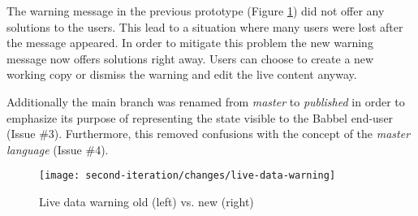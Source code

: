 The warning message in the previous prototype (Figure \ref{fig:live-data-warning}) did not offer any solutions to the users. This lead to a situation where many users were lost after the message appeared. In order to mitigate this problem the new warning message now offers solutions right away. Users can choose to create a new working copy or dismiss the warning and edit the live content anyway.

Additionally the main branch was renamed from \emph{master} to \emph{published} in order to emphasize its purpose of representing the state visible to the Babbel end-user (Issue \#3). Furthermore, this removed confusions with the concept of the \emph{master language} (Issue \#4).



\begin{figure}[h!]
 \centering
 \texttt{[image: second-iteration/changes/live-data-warning]}
 \caption{Live data warning old (left) vs. new (right)}
 \label{fig:live-data-warning}
\end{figure}


